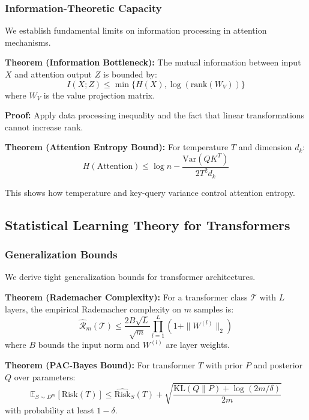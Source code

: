 \subsubsection{Information-Theoretic Capacity}

We establish fundamental limits on information processing in attention mechanisms.

\textbf{Theorem (Information Bottleneck):} The mutual information between input $X$ and attention output $Z$ is bounded by:
\begin{equation}
I(X; Z) \leq \min\{H(X), \log(\text{rank}(W_V))\}
\end{equation}
where $W_V$ is the value projection matrix.

\textbf{Proof:} Apply data processing inequality and the fact that linear transformations cannot increase rank.

\textbf{Theorem (Attention Entropy Bound):} For temperature $T$ and dimension $d_k$:
\begin{equation}
H(\text{Attention}) \leq \log n - \frac{\text{Var}(QK^T)}{2T^2 d_k}
\end{equation}

This shows how temperature and key-query variance control attention entropy.

\subsection{Statistical Learning Theory for Transformers}

\subsubsection{Generalization Bounds}

We derive tight generalization bounds for transformer architectures.

\textbf{Theorem (Rademacher Complexity):} For a transformer class $\mathcal{T}$ with $L$ layers, the empirical Rademacher complexity on $m$ samples is:
\begin{equation}
\hat{\mathcal{R}}_m(\mathcal{T}) \leq \frac{2B\sqrt{L}}{\sqrt{m}} \prod_{l=1}^{L} (1 + \|W^{(l)}\|_2)
\end{equation}
where $B$ bounds the input norm and $W^{(l)}$ are layer weights.

\textbf{Theorem (PAC-Bayes Bound):} For transformer $T$ with prior $P$ and posterior $Q$ over parameters:
\begin{equation}
\mathbb{E}_{S \sim D^m}[\text{Risk}(T)] \leq \hat{\text{Risk}}_S(T) + \sqrt{\frac{\text{KL}(Q\|P) + \log(2m/\delta)}{2m}}
\end{equation}
with probability at least $1-\delta$.


